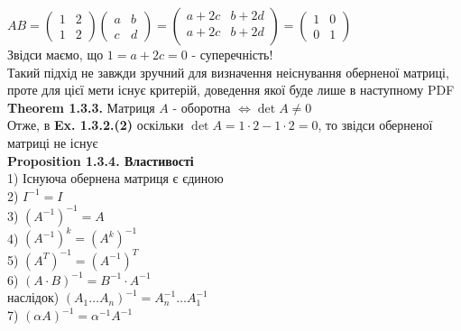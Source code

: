 \documentclass[a4paper, 10pt]{article}
\def\prp#1{\textbf{Proposition {#1}}}
\def\th#1{\textbf{Theorem {#1}}}
\theoremstyle{theoremdd}
\theoremstyle{theoremdd}
\theoremstyle{theoremdd}
\theoremstyle{theoremdd}
\theoremstyle{theoremdd}
\theoremstyle{theoremdd}
\theoremstyle{theoremdd}
\theoremstyle{theoremdd}
\begin{document}
	$AB = \begin{pmatrix}
	1 & 2 \\
	1 & 2
	\end{pmatrix} \begin{pmatrix}
	a & b \\
	c & d
	\end{pmatrix} = \begin{pmatrix}
	a + 2c & b + 2d \\
	a + 2c & b + 2d \\
	\end{pmatrix} = \begin{pmatrix}
	1 & 0 \\
	0 & 1
	\end{pmatrix}$\\
	Звідси маємо, що $1 = a + 2c = 0$ - суперечність!\\
	Такий підхід не завжди зручний для визначення неіснування оберненої матриці, проте для цієї мети існує критерій, доведення якої буде лише в наступному PDF
	\bigskip \\
	\th{1.3.3.} Матриця $A$ - оборотна $\iff \det A \neq 0$
	\bigskip \\
	Отже, в \textbf{Ex. 1.3.2.(2)} оскільки $\det A = 1 \cdot 2 - 1 \cdot 2 = 0$, то звідси оберненої матриці не існує
	\bigskip \\
	\prp{1.3.4. Властивості}\\
	1) Існуюча обернена матриця є єдиною\\
	2) $I^{-1} = I$\\
	3) $(A^{-1})^{-1} = A$\\
	4) $(A^{-1})^k = (A^k)^{-1}$\\
	5) $(A^T)^{-1} = (A^{-1})^T$\\
	6) $(A \cdot B)^{-1} = B^{-1} \cdot A^{-1}$\\
	наслідок) $(A_1 \dots A_n)^{-1} = A_n^{-1} \dots A_1^{-1}$\\
	7) $(\alpha A)^{-1} = \alpha^{-1} A^{-1}$\\
\end{document}
